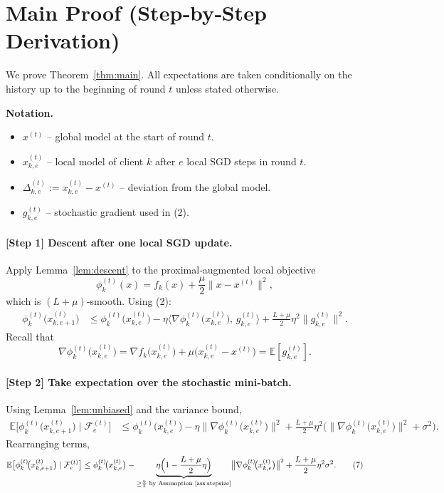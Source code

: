 \documentclass[11pt]{article}
\newcommand{\E}{\mathbb{E}}
\begin{document}
\section*{Main Proof (Step‑by‑Step Derivation)}
We prove Theorem~\ref{thm:main}.  
All expectations are taken conditionally on the history up to the beginning of round $t$ unless stated otherwise.

\noindent\textbf{Notation.} 
\begin{itemize}
\item $x^{(t)}$ – global model at the start of round $t$.
\item $x^{(t)}_{k,e}$ – local model of client $k$ after $e$ local SGD steps in round $t$.
\item $\Delta^{(t)}_{k,e}:=x^{(t)}_{k,e}-x^{(t)}$ – deviation from the global model.
\item $g^{(t)}_{k,e}$ – stochastic gradient used in (2).
\end{itemize}

\paragraph{[Step 1] Descent after one local SGD update.}
Apply Lemma~\ref{lem:descent} to the proximal‑augmented local objective
\[
\phi_k^{(t)}(x)=f_k(x)+\frac{\mu}{2}\|x-x^{(t)}\|^2,
\]
which is $(L+\mu)$‑smooth. Using (2):
\begin{align}
\phi_k^{(t)}\!\bigl(x^{(t)}_{k,e+1}\bigr)
&\le
\phi_k^{(t)}\!\bigl(x^{(t)}_{k,e}\bigr)
-\eta\langle\nabla\phi_k^{(t)}\!\bigl(x^{(t)}_{k,e}\bigr),\,g^{(t)}_{k,e}\rangle
+\frac{L+\mu}{2}\eta^2\|g^{(t)}_{k,e}\|^2 .
\tag{5}
\end{align}
Recall that
\[
\nabla\phi_k^{(t)}\!\bigl(x^{(t)}_{k,e}\bigr)=\nabla f_k\!\bigl(x^{(t)}_{k,e}\bigr)+\mu\bigl(x^{(t)}_{k,e}-x^{(t)}\bigr)
= \E[g^{(t)}_{k,e}] .
\]

\paragraph{[Step 2] Take expectation over the stochastic mini‑batch.}
Using Lemma~\ref{lem:unbiased} and the variance bound,
\begin{align}
\E\bigl[\phi_k^{(t)}\!\bigl(x^{(t)}_{k,e+1}\bigr)\mid\mathcal{F}^{(t)}_{e}\bigr]
&\le
\phi_k^{(t)}\!\bigl(x^{(t)}_{k,e}\bigr)
-\eta\bigl\|\nabla\phi_k^{(t)}\!\bigl(x^{(t)}_{k,e}\bigr)\bigr\|^2
+\frac{L+\mu}{2}\eta^2\bigl(\|\nabla\phi_k^{(t)}\!\bigl(x^{(t)}_{k,e}\bigr)\|^2+\sigma^2\bigr) .
\tag{6}
\end{align}
Rearranging terms,
\begin{align}
\E\bigl[\phi_k^{(t)}\!\bigl(x^{(t)}_{k,e+1}\bigr)\mid\mathcal{F}^{(t)}_{e}\bigr]
\le
\phi_k^{(t)}\!\bigl(x^{(t)}_{k,e}\bigr)
-\underbrace{\eta\Bigl(1-\frac{L+\mu}{2}\eta\Bigr)}_{\ge \frac{\eta}{2}\text{ by Assumption~\ref{ass:stepsize}}}
\bigl\|\nabla\phi_k^{(t)}\!\bigl(x^{(t)}_{k,e}\bigr)\bigr\|^2
+\frac{L+\mu}{2}\eta^2\sigma^2 .
\tag{7}
\end{align}
\end{document}
